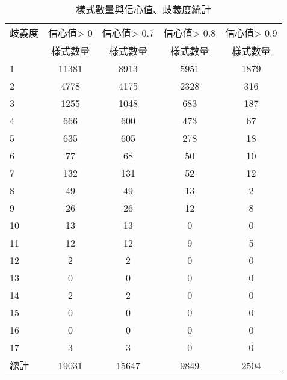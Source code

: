 \begin{table}[t]
    \begin{center}
        \small
        \begin{tabular}{l||c|c|c|c}
        歧義度 & 信心值> 0 & 信心值> 0.7 & 信心值> 0.8 & 信心值> 0.9\\
          & 樣式數量 & 樣式數量 & 樣式數量 & 樣式數量 \\
        \hline
        1 & 11381 & 8913 & 5951 & 1879 \\
        2 & 4778 & 4175 & 2328 & 316 \\
        3 & 1255 & 1048 & 683 & 187 \\
        4 & 666 & 600 & 473 & 67 \\
        5 & 635 & 605 & 278 & 18 \\
        6 & 77 & 68 & 50 & 10 \\
        7 & 132 & 131 & 52 & 12 \\
        8 & 49 & 49 & 13 & 2 \\
        9 & 26 & 26 & 12 & 8 \\
        10 & 13 & 13 & 0 & 0 \\
        11 & 12 & 12 & 9 & 5 \\
        12 & 2 & 2 & 0 & 0 \\
        13 & 0 & 0 & 0 & 0 \\
        14 & 2 & 2 & 0 & 0 \\
        15 & 0 & 0 & 0 & 0 \\
        16 & 0 & 0 & 0 & 0 \\
        17 & 3 & 3 & 0 & 0 \\
        \hline
        總計 & 19031 & 15647 & 9849 & 2504 \\
        \end{tabular}
        \caption{樣式數量與信心值、歧義度統計}
        \label{t:yago-degree}
    \end{center}
\end{table}
